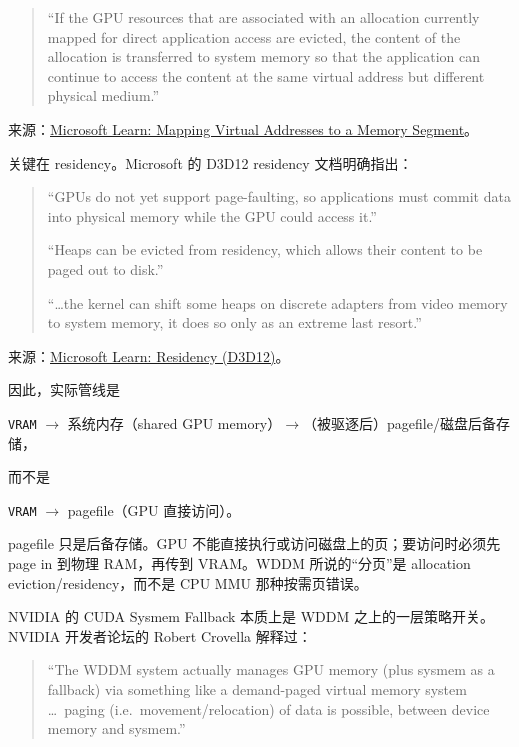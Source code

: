 \documentclass[a4paper, 12pt, linespread=1.35]{ctexart}   %
\begin{document}
\begin{quote}
\small
``If the GPU resources that are associated with an allocation currently mapped for direct application access are evicted, the content of the allocation is transferred to system memory so that the application can continue to access the content at the same virtual address but different physical medium.''
\end{quote}

\noindent
来源：\href{https://learn.microsoft.com/en-us/windows-hardware/drivers/display/mapping-virtual-addresses-to-a-memory-segment}{Microsoft Learn: Mapping Virtual Addresses to a Memory Segment}。

关键在 residency。Microsoft 的 D3D12 residency 文档明确指出：

\begin{quote}
\small
``GPUs do not yet support page-faulting, so applications must commit data into physical memory while the GPU could access it.''

``Heaps can be evicted from residency, which allows their content to be paged out to disk.''

``\ldots the kernel can shift some heaps on discrete adapters from video memory to system memory, it does so only as an extreme last resort.''
\end{quote}

\noindent
来源：\href{https://learn.microsoft.com/en-us/windows/win32/direct3d12/residency}{Microsoft Learn: Residency (D3D12)}。

因此，实际管线是
\begin{center}
\texttt{VRAM} $\rightarrow$ 系统内存（shared GPU memory）$\rightarrow$（被驱逐后）pagefile/磁盘后备存储，
\end{center}
而不是
\begin{center}
\texttt{VRAM} $\rightarrow$ pagefile（GPU 直接访问）。
\end{center}

pagefile 只是后备存储。GPU 不能直接执行或访问磁盘上的页；要访问时必须先 page in 到物理 RAM，再传到 VRAM。WDDM 所说的“分页”是 allocation eviction/residency，而不是 CPU MMU 那种按需页错误。

NVIDIA 的 CUDA Sysmem Fallback 本质上是 WDDM 之上的一层策略开关。NVIDIA 开发者论坛的 Robert Crovella 解释过：

\begin{quote}
\small
``The WDDM system actually manages GPU memory (plus sysmem as a fallback) via something like a demand-paged virtual memory system \ldots\ paging (i.e.\ movement/relocation) of data is possible, between device memory and sysmem.''
\end{quote}
\end{document}

